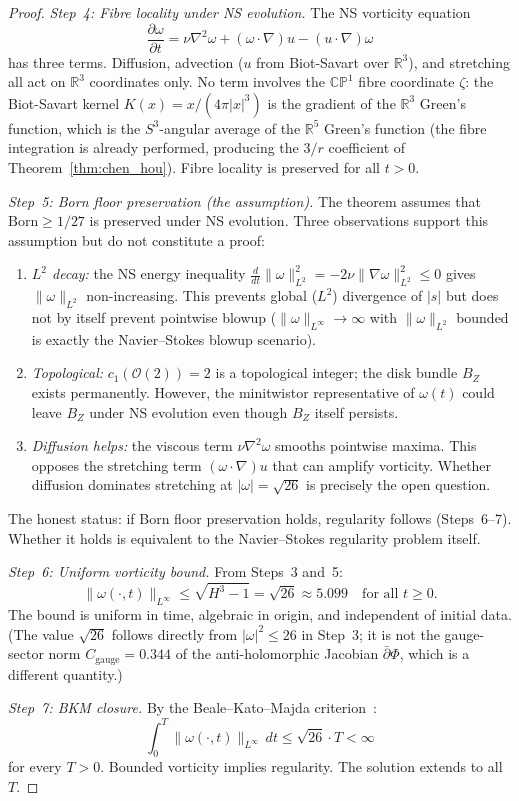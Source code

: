 \documentclass[11pt,a4paper]{article}
\theoremstyle{definition}
\theoremstyle{remark}
\newcommand{\CP}{\mathbb{CP}}
\newcommand{\R}{\mathbb{R}}
\newcommand{\dbar}{\bar{\partial}}
\begin{document}
\begin{proof}
\emph{Step~4: Fibre locality under NS evolution.} The NS vorticity equation
\[
\frac{\partial\omega}{\partial t}=\nu\nabla^2\omega+(\omega\cdot\nabla)u-(u\cdot\nabla)\omega
\]
has three terms. Diffusion, advection ($u$ from Biot-Savart over $\R^3$), and stretching all act on $\R^3$ coordinates only. No term involves the $\CP^1$ fibre coordinate $\zeta$: the Biot-Savart kernel $K(x)=x/(4\pi|x|^3)$ is the gradient of the $\R^3$ Green's function, which is the $S^3$-angular average of the $\R^5$ Green's function (the fibre integration is already performed, producing the $3/r$ coefficient of Theorem~\ref{thm:chen_hou}). Fibre locality is preserved for all $t>0$.

\emph{Step~5: Born floor preservation (the assumption).} The theorem assumes that $\mathrm{Born}\geq 1/27$ is preserved under NS evolution. Three observations support this assumption but do not constitute a proof:
\begin{enumerate}[nosep]
\item[(a)] \emph{$L^2$ decay:} the NS energy inequality $\frac{d}{dt}\|\omega\|_{L^2}^2=-2\nu\|\nabla\omega\|_{L^2}^2\leq 0$ gives $\|\omega\|_{L^2}$ non-increasing. This prevents global ($L^2$) divergence of $|s|$ but does not by itself prevent pointwise blowup ($\|\omega\|_{L^\infty}\to\infty$ with $\|\omega\|_{L^2}$ bounded is exactly the Navier--Stokes blowup scenario).
\item[(b)] \emph{Topological:} $c_1(\mathcal{O}(2))=2$ is a topological integer; the disk bundle $B_Z$ exists permanently. However, the minitwistor representative of $\omega(t)$ could leave $B_Z$ under NS evolution even though $B_Z$ itself persists.
\item[(c)] \emph{Diffusion helps:} the viscous term $\nu\nabla^2\omega$ smooths pointwise maxima. This opposes the stretching term $(\omega\cdot\nabla)u$ that can amplify vorticity. Whether diffusion dominates stretching at $|\omega|=\sqrt{26}$ is precisely the open question.
\end{enumerate}
The honest status: if Born floor preservation holds, regularity follows (Steps~6--7). Whether it holds is equivalent to the Navier--Stokes regularity problem itself.

\emph{Step~6: Uniform vorticity bound.} From Steps~3 and~5:
\[
\|\omega(\cdot,t)\|_{L^\infty}\leq\sqrt{H^3-1}=\sqrt{26}\approx 5.099\quad\text{for all }t\geq 0.
\]
The bound is uniform in time, algebraic in origin, and independent of initial data. (The value $\sqrt{26}$ follows directly from $|\omega|^2\leq 26$ in Step~3; it is not the gauge-sector norm $C_{\mathrm{gauge}}=0.344$ of the anti-holomorphic Jacobian $\dbar\Phi$, which is a different quantity.)

\emph{Step~7: BKM closure.} By the Beale--Kato--Majda criterion~\cite{BKM1984}:
\[
\int_0^T\!\|\omega(\cdot,t)\|_{L^\infty}\,dt\leq\sqrt{26}\cdot T<\infty
\]
for every $T>0$. Bounded vorticity implies regularity. The solution extends to all $T$.
\end{proof}
\end{document}

